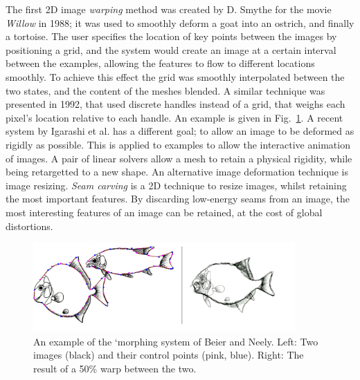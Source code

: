 


The first 2D image \emph{warping} method was created by D. Smythe for the movie \emph{Willow}\cite{Smythe90} in 1988; it was used to smoothly deform a goat into an ostrich, and finally a tortoise. The user specifies the location of key points between the images by positioning a grid, and the system would create an image at a certain interval between the examples, allowing the features to flow to different locations smoothly. To achieve this effect the grid was smoothly interpolated between the two states, and the content of the meshes blended. A similar technique was presented in 1992\cite{Beier92}, that used discrete handles instead of a grid, that weighs each pixel's location relative to each handle. An example is given in Fig.~\ref{fig:morph}. A recent system by Igarashi et al. has a different goal; to allow an image to be deformed as rigidly as possible\cite{Igarashi05}. This is applied to examples to allow the interactive animation of images. A pair of linear solvers allow a mesh to retain a physical rigidity, while being retargetted to a new shape. 
An alternative image deformation technique is image resizing. \emph{Seam carving} is a 2D technique to resize images, whilst retaining the most important features\cite{Avidan07}. By discarding low-energy seams from an image, the most interesting features of an image can be retained, at the cost of global distortions.

\begin{figure}
  \centering
  \includegraphics[width=10cm]{morph.png}
  \caption[Image warping]{An example of the `morphing system of Beier and Neely\cite{Beier92}. Left: Two images (black) and their control points (pink, blue). Right: The result of a 50\% warp between the two.}
  \label{fig:morph}
\end{figure}

